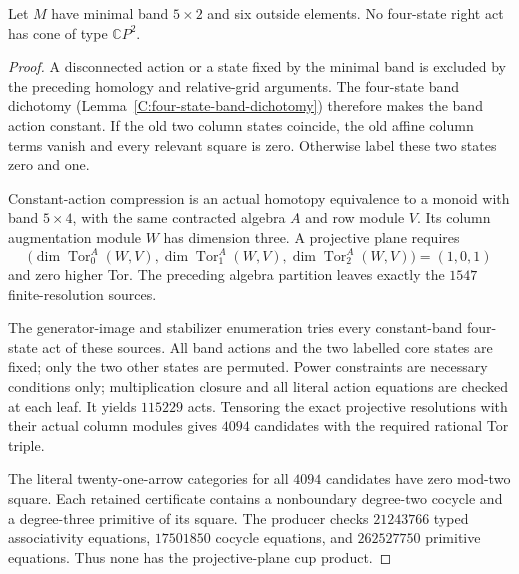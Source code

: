\begin{theorem}
\label{C:five-row-six-outside-four-state-cones}
Let $M$ have minimal band $5\times2$ and six outside elements.
No four-state right act has cone of type $\mathbb CP^2$.
\end{theorem}
\begin{proof}
A disconnected action or a state fixed by the minimal band is
excluded by the preceding homology and relative-grid arguments.
The four-state band dichotomy
(Lemma~\ref{C:four-state-band-dichotomy}) therefore makes the
band action constant. If the old two column states coincide,
the old affine column terms vanish and every relevant square is
zero. Otherwise label these two states zero and one.

Constant-action compression is an actual homotopy equivalence to
a monoid with band $5\times4$, with the same contracted algebra
$A$ and row module $V$. Its column augmentation module $W$ has
dimension three. A projective plane requires
\[
 \bigl(\dim\operatorname{Tor}_0^A(W,V),
       \dim\operatorname{Tor}_1^A(W,V),
       \dim\operatorname{Tor}_2^A(W,V)\bigr)=(1,0,1)
\]
and zero higher Tor. The preceding algebra partition leaves exactly
the $1547$ finite-resolution sources.

The generator-image and stabilizer enumeration tries every
constant-band four-state act of these sources. All band actions and
the two labelled core states are fixed; only the two other states
are permuted. Power constraints are necessary conditions only;
multiplication closure and all literal action equations are checked
at each leaf. It yields $115229$ acts. Tensoring the exact
projective resolutions with their actual column modules gives
$4094$ candidates with the required rational Tor triple.

The literal twenty-one-arrow categories for all $4094$ candidates
have zero mod-two square. Each retained certificate contains a
nonboundary degree-two cocycle and a degree-three primitive of its
square. The producer checks $21243766$ typed associativity equations,
$17501850$ cocycle equations, and $262527750$ primitive equations.
Thus none has the projective-plane cup product.


\end{proof}
